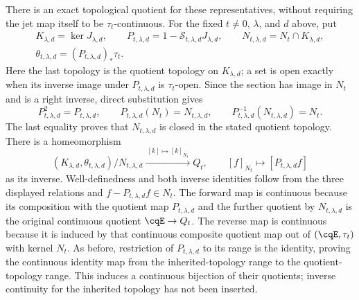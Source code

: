 There is an exact topological quotient for these representatives,
without requiring the jet map itself to be $\tau_t$-continuous.
For the fixed $t\ne0$, $\lambda$, and $d$ above, put
\begin{gather*}
 K_{\lambda,d}=\ker J_{\lambda,d},\qquad
 P_{t,\lambda,d}=1-\mathcal S_{t,\lambda,d}J_{\lambda,d},\qquad
 N_{t,\lambda,d}=N_t\cap K_{\lambda,d},\\
 \theta_{t,\lambda,d}=(P_{t,\lambda,d})_*\tau_t.
\end{gather*}
Here the last topology is the quotient topology on
$K_{\lambda,d}$; a set is open exactly when its inverse
image under $P_{t,\lambda,d}$ is $\tau_t$-open.
Since the section has image in $N_t$ and is a right inverse,
direct substitution gives
\[
 P_{t,\lambda,d}^2=P_{t,\lambda,d},\qquad
 P_{t,\lambda,d}(N_t)=N_{t,\lambda,d},\qquad
 P_{t,\lambda,d}^{-1}(N_{t,\lambda,d})=N_t.
\]
The last equality proves that $N_{t,\lambda,d}$ is closed
in the stated quotient topology. There is a homeomorphism
\begin{equation}
 (K_{\lambda,d},\theta_{t,\lambda,d})/N_{t,\lambda,d}
  \xrightarrow{\ [k]\mapsto[k]_{N_t}\ }Q_t,
 \qquad
 [f]_{N_t}\longmapsto[P_{t,\lambda,d}f]
 \label{eq:cq-moving-jet-source-quotient}
\end{equation}
as its inverse. Well-definedness and both inverse identities
follow from the three displayed relations and
$f-P_{t,\lambda,d}f\in N_t$. The forward map is continuous
because its composition with the quotient map
$P_{t,\lambda,d}$ and the further quotient by
$N_{t,\lambda,d}$ is the original continuous quotient
$\cqE\to Q_t$. The reverse map is continuous because
it is induced by that continuous composite quotient map
out of $(\cqE,\tau_t)$ with kernel $N_t$.
As before, restriction of $P_{t,\lambda,d}$ to its range
is the identity, proving the continuous identity map from
the inherited-topology range to the quotient-topology
range. This induces a continuous bijection of their
quotients; inverse continuity for the inherited topology
has not been inserted.

